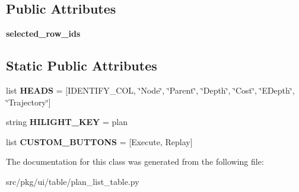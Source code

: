 \subsection*{Public Attributes}
\begin{DoxyCompactItemize}
\item 
\mbox{\label{classrnb-planning_1_1src_1_1pkg_1_1ui_1_1table_1_1plan__list__table_1_1_plan_list_table_ab500447eb3ecbcc2493e188c54185715}} 
{\bfseries selected\+\_\+row\+\_\+ids}
\end{DoxyCompactItemize}
\subsection*{Static Public Attributes}
\begin{DoxyCompactItemize}
\item 
\mbox{\label{classrnb-planning_1_1src_1_1pkg_1_1ui_1_1table_1_1plan__list__table_1_1_plan_list_table_a8fdb028ddd252b07deeb027c52e335b8}} 
list {\bfseries H\+E\+A\+DS} = \mbox{[}I\+D\+E\+N\+T\+I\+F\+Y\+\_\+\+C\+OL, \char`\"{}Node\char`\"{}, \char`\"{}Parent\char`\"{}, \char`\"{}Depth\char`\"{}, \char`\"{}Cost\char`\"{}, \char`\"{}E\+Depth\char`\"{}, \char`\"{}Trajectory\char`\"{}\mbox{]}
\item 
\mbox{\label{classrnb-planning_1_1src_1_1pkg_1_1ui_1_1table_1_1plan__list__table_1_1_plan_list_table_a77383176a422ba7221ca96bd5b74bbcb}} 
string {\bfseries H\+I\+L\+I\+G\+H\+T\+\_\+\+K\+EY} = \textquotesingle{}plan\textquotesingle{}
\item 
\mbox{\label{classrnb-planning_1_1src_1_1pkg_1_1ui_1_1table_1_1plan__list__table_1_1_plan_list_table_a2521f3181439024998ee54539e0f40b7}} 
list {\bfseries C\+U\+S\+T\+O\+M\+\_\+\+B\+U\+T\+T\+O\+NS} = \mbox{[}\textquotesingle{}Execute\textquotesingle{}, \textquotesingle{}Replay\textquotesingle{}\mbox{]}
\end{DoxyCompactItemize}


The documentation for this class was generated from the following file\+:\begin{DoxyCompactItemize}
\item 
src/pkg/ui/table/plan\+\_\+list\+\_\+table.\+py\end{DoxyCompactItemize}
